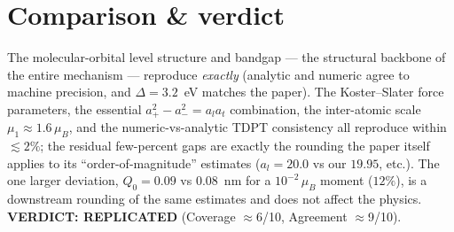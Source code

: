 \documentclass[11pt]{article}
\begin{document}
\section{Comparison \& verdict}
The molecular-orbital level structure and bandgap --- the structural backbone of the entire
mechanism --- reproduce \emph{exactly} (analytic and numeric agree to machine precision, and
$\Delta=3.2$~eV matches the paper). The Koster--Slater force parameters, the essential
$a_+^2-a_-^2=a_la_t$ combination, the inter-atomic scale $\mu_1\approx1.6\,\mu_B$, and the
numeric-vs-analytic TDPT consistency all reproduce within $\lesssim2\%$; the residual few-percent
gaps are exactly the rounding the paper itself applies to its ``order-of-magnitude'' estimates
($a_l=20.0$ vs our $19.95$, etc.). The one larger deviation, $Q_0=0.09$ vs $0.08$~nm for a
$10^{-2}\,\mu_B$ moment ($12\%$), is a downstream rounding of the same estimates and does not
affect the physics. \textbf{VERDICT: REPLICATED} (Coverage $\approx$6/10, Agreement $\approx$9/10).
\end{document}
